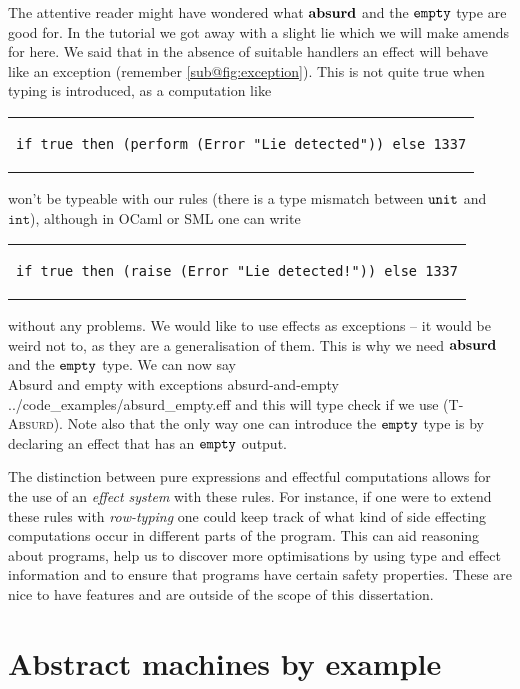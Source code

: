 \documentclass[class=article, crop=false]{standalone}
\begin{document}
The attentive reader might have wondered what $\mathbf{absurd}\ $and the $\mathtt{empty}$
type are good for. In the tutorial we got away with a slight lie which we will
make amends for here. We said that in the absence of suitable handlers an effect
will behave like an exception (remember \autoref{sub@fig:exception}). This is
not quite true when typing is introduced, as a computation like
%
\begin{center}
\begin{tabular}{c}
{\begin{lstlisting}[language=caml, numbers=none, frame=none]
if true then (perform (Error "Lie detected")) else 1337
\end{lstlisting}}
\end{tabular}
\end{center}
%
won't be typeable with our rules (there is a type mismatch between $\mathtt{unit}$
and $\mathtt{int}$), although in OCaml or SML one can write
%
\begin{center}
\begin{tabular}{c}
{\begin{lstlisting}[language=caml, numbers=none, frame=none]
if true then (raise (Error "Lie detected!")) else 1337
\end{lstlisting}}
\end{tabular}
\end{center}
%
without any problems. We would like to use effects as exceptions -- it would be
weird not to, as they are a generalisation of them. This is why we need
$\mathbf{absurd}\ $and the $\mathtt{empty}$ type. We can now say
\\
{Absurd and empty with exceptions}
{absurd-and-empty}
{../code_examples/absurd_empty.eff}
%
and this will type check if we use (\textsc{T-Absurd}). Note also that the only
way one can introduce the $\mathtt{empty}$ type is by declaring an effect that has
an $\mathtt{empty}$ output.

The distinction between pure expressions and effectful computations allows for
the use of an \emph{effect system} with these rules. For instance, if one were
to extend these rules with \emph{row-typing} one could keep track of what kind
of side effecting computations occur in different parts of the program. This can
aid reasoning about programs, help us to discover more optimisations by using
type and effect information and to ensure that programs have certain safety
properties. These are nice to have features and are outside of the scope of this
dissertation.

\section{Abstract machines by example}
\end{document}
